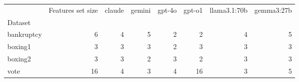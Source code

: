 \begin{tabular}{lrrrrrrr}
\toprule
 & Features set size & claude & gemini & gpt-4o & gpt-o1 & llama3.1:70b & gemma3:27b \\
Dataset &  &  &  &  &  &  &  \\
\midrule
bankruptcy & 6 & 4 & 5 & 2 & 2 & 4 & 5 \\
boxing1 & 3 & 3 & 3 & 2 & 3 & 3 & 3 \\
boxing2 & 3 & 3 & 2 & 3 & 2 & 3 & 3 \\
vote & 16 & 4 & 3 & 4 & 16 & 3 & 5 \\
\bottomrule
\end{tabular}
